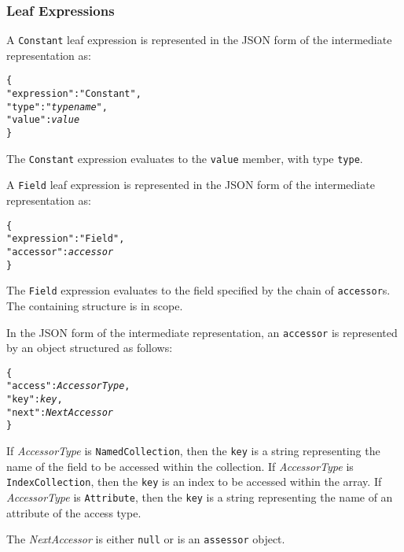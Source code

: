 \documentclass[10pt,twocolumn,a4paper]{article}
\newcommand{\code}[1]{\texttt{#1}}
\begin{document}
\subsubsection{Leaf Expressions}

A \code{Constant} leaf expression is represented in the JSON form of the
intermediate representation as:
\footnotesize
\begin{alltt}
  \{
    "expression"   : "Constant",
    "type"         : "\emph{type name}",
    "value"        : \emph{value}
  \}
\end{alltt}
\normalsize
The \code{Constant} expression evaluates to the \code{value} member, with type \code{type}.

A \code{Field} leaf expression is represented in the JSON form of the
intermediate representation as:
\footnotesize
\begin{alltt}
  \{
    "expression"   : "Field",
    "accessor"     : \emph{accessor}
  \}
\end{alltt}
\normalsize

The \code{Field} expression evaluates to the field specified by the chain of
\code{accessor}s. The containing structure is in scope.

In the JSON form of the intermediate representation, an \code{accessor} is
represented by an object structured as follows:
\footnotesize
\begin{alltt}
  \{
    "access" : \emph{AccessorType},
    "key"    : \emph{key},
    "next"   : \emph{NextAccessor}
  \}
\end{alltt}
\normalsize

If \emph{AccessorType} is \code{NamedCollection}, then the \code{key}
is a string representing the name of the field to be accessed within the
collection.
%
If \emph{AccessorType} is \code{IndexCollection}, then the \code{key} is
an index to be accessed within the array.
%
If \emph{AccessorType} is \code{Attribute}, then the \code{key} is a string
representing the name of an attribute of the access type.

The \emph{NextAccessor} is either \code{null} or is an \code{assessor}
object.
\end{document}
